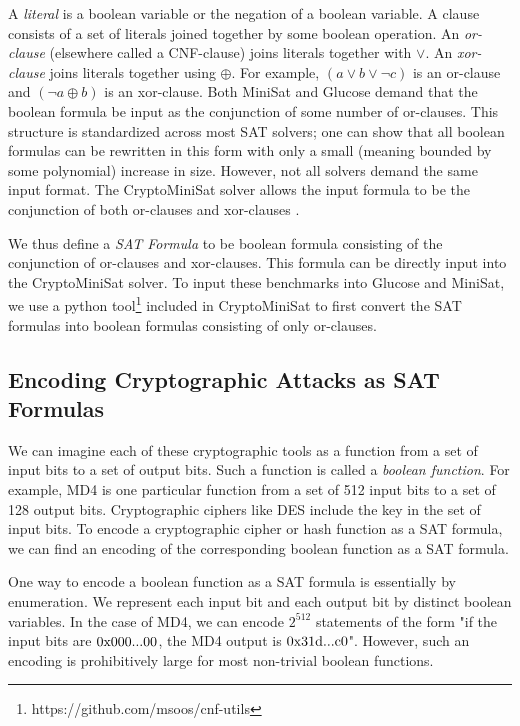A \emph{literal} is a boolean variable or the negation of a boolean variable. A clause consists of a set of literals joined together by some boolean operation. An \emph{or-clause} (elsewhere called a CNF-clause) joins literals together with $\lor$. An \emph{xor-clause} joins literals together using $\oplus$. For example, $(a \lor b \lor \neg c)$ is an or-clause and $(\neg a \oplus b)$ is an xor-clause. Both MiniSat and Glucose demand that the boolean formula be input as the conjunction of some number of or-clauses. This structure is standardized across most SAT solvers; one can show that all boolean formulas can be rewritten in this form with only a small (meaning bounded by some polynomial) increase in size. However, not all solvers demand the same input format. The CryptoMiniSat \cite{SNC09} solver allows the input formula to be the conjunction of both or-clauses and xor-clauses . 

We thus define a \emph{SAT Formula} to be boolean formula consisting of the conjunction of or-clauses and xor-clauses. This formula can be directly input into the CryptoMiniSat solver. To input these benchmarks into Glucose and MiniSat, we use a python tool\footnote{https://github.com/msoos/cnf-utils} included in CryptoMiniSat to first convert the SAT formulas into boolean formulas consisting of only or-clauses.


\subsection{Encoding Cryptographic Attacks as SAT Formulas}
\label{sec:encoding:desc}
We can imagine each of these cryptographic tools as a function from a set of input bits to a set of output 
bits. Such a function is called a \emph{boolean function}. For example, MD4 is one particular function from a set of 512 input bits to a set of 128 output bits. Cryptographic ciphers like DES include the key in the set of input bits. To encode a cryptographic cipher or hash function as a SAT formula, we can find an encoding of the corresponding boolean function as a SAT formula.

One way to encode a boolean function as a SAT formula is essentially by enumeration. We represent each input bit and each output bit by distinct boolean variables. In the case of MD4, we can encode $2^{512}$ statements of the form "if the input bits are $0\text{x000...00}$, the MD4 output is $0\text{x31d...c0}$". However, such an encoding is prohibitively large for most non-trivial boolean functions.

